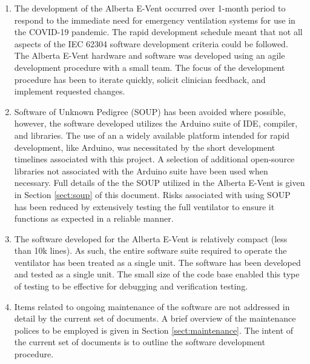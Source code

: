 \documentclass[]{article}
\begin{document}
\begin{center}
\begin{longtable}{ |p{1.3cm}| p{5.5cm}| p{0.7cm}| p{0.7cm}| p{0.7cm}| p{3.5cm}| }
	
\end{longtable}
\begin{enumerate}
	\item The development of the Alberta E-Vent occurred over 1-month period to respond to the immediate need for emergency ventilation systems for use in the COVID-19 pandemic.  The rapid development schedule meant that not all aspects of the IEC 62304 software development criteria could be followed.  The Alberta E-Vent hardware and software was developed using an agile development procedure with a small team.  The focus of the development procedure has been to iterate quickly, solicit clinician feedback, and implement requested changes.
	\item Software of Unknown Pedigree (SOUP) has been avoided where possible, however, the software developed utilizes the Arduino suite of IDE, compiler, and libraries.  The use of an a widely available platform intended for rapid development, like Arduino, was necessitated by the short development timelines associated with this project.  A selection of additional open-source libraries not associated with the Arduino suite have been used when necessary.  Full details of the the SOUP utilized in the Alberta E-Vent is given in Section \ref{sect:soup} of this document.  Risks associated with using SOUP has been reduced by extensively testing the full ventilator to ensure it functions as expected in a reliable manner.
	\item The software developed for the Alberta E-Vent is relatively compact (less than 10k lines). As such, the entire  software suite required to operate the ventilator has been treated as a single unit.  The software has been developed and tested as a single unit. The small size of the code base enabled this type of testing to be effective for debugging and verification testing.
	\item Items related to ongoing maintenance of the software are not addressed in detail by the current set of documents.  A brief overview of the maintenance polices to be employed is given in Section \ref{sect:maintenance}. The intent of the current set of documents is to outline the software development procedure.
	
\end{enumerate}
\end{center}





\clearpage
\end{document}
